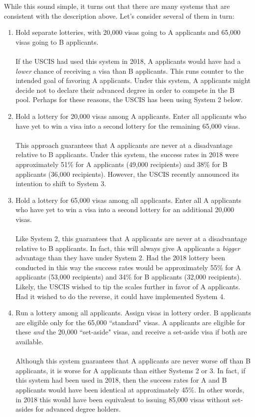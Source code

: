 \documentclass[11pt, oneside]{article}   	%
\begin{document}
While this sound simple, it turns out that there are many systems that are consistent with the description above. Let's consider several of them in turn:
\begin{enumerate}
\item Hold separate lotteries, with 20,000 visas going to A applicants and 65,000 visas going to B applicants. \\ \\
If the USCIS had used this system in 2018, A applicants would have had a {\em lower} chance of receiving a visa than B applicants. This runs counter to the intended goal of favoring A applicants. Under this system, A applicants might decide not to declare their advanced degree in order to compete in the B pool. Perhaps for these reasons, the USCIS has been using System 2 below.
\item Hold a lottery for 20,000 visas among A applicants. Enter all applicants who have yet to win a visa into a second lottery for the remaining 65,000 visas. \\ \\
This approach guarantees that A applicants are never at a disadvantage relative to B applicants. Under this system, the success rates in 2018 were approximately 51\% for A applicants (49,000 recipients) and 38\% for B applicants (36,000 recipients). However, the USCIS recently announced its intention to shift to System 3.
\item Hold a lottery for 65,000 visas among all applicants. Enter all A applicants who have yet to win a visa into a second lottery for an additional 20,000 visas.\\ \\
Like System 2, this guarantees that A applicants are never at a disadvantage relative to B applicants. In fact, this will always give A applicants a {\em bigger} advantage than they have under System 2. Had the 2018 lottery been conducted in this way the success rates would be approximately 55\% for A applicants (53,000 recipients) and 34\% for B applicants (32,000 recipients). Likely, the USCIS wished to tip the scales further in favor of A applicants. Had it wished to do the reverse, it could have implemented System 4.
\item Run a lottery among all applicants. Assign visas in lottery order. B applicants are eligible only for the 65,000 ``standard" visas.  A applicants are eligible for these {\em and} the 20,000 ``set-aside" visas, and receive a set-aside visa if both are available. \\ \\
Although this system guarantees that A applicants are never worse off than B applicants, it is worse for A applicants than either Systems 2 or 3. In fact, if this system had been used in 2018, then the success rates for A and B applicants would have been identical at approximately 45\%. In other words, in 2018 this would have been equivalent to issuing 85,000 visas without set-asides for advanced degree holders.
\end{enumerate}
\end{document}

